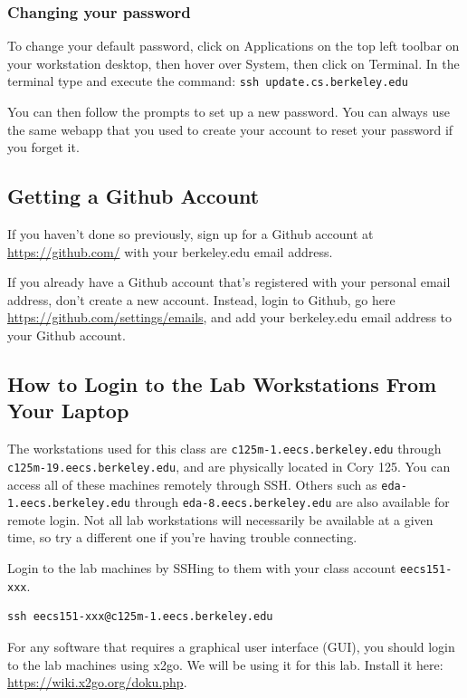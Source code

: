 \documentclass[11pt]{article}
\begin{document}
\subsubsection{Changing your password}
To change your default password, click on Applications on the top left toolbar on your workstation desktop, then hover over System, then click on Terminal. In the terminal type and execute the command: \verb|ssh update.cs.berkeley.edu|

You can then follow the prompts to set up a new password. You can always use the same webapp that you used to create your account to reset your password if you forget it.

\subsection{Getting a Github Account}
If you haven't done so previously, sign up for a Github account at \url{https://github.com/} with your berkeley.edu email address.

If you already have a Github account that's registered with your personal email address, don't create a new account. Instead, login to Github, go here \url{https://github.com/settings/emails}, and add your berkeley.edu email address to your Github account.

\subsection{How to Login to the Lab Workstations From Your Laptop}
The workstations used for this class are \texttt{c125m-1.eecs.berkeley.edu} through \texttt{c125m-19.eecs.berkeley.edu}, and are physically located in Cory 125.
You can access all of these machines remotely through SSH.
Others such as \texttt{eda-1.eecs.berkeley.edu} through \texttt{eda-8.eecs.berkeley.edu} are also available for remote login. Not all lab workstations will necessarily be available at a given time, so try a different one if you're having trouble connecting.

Login to the lab machines by SSHing to them with your class account \texttt{eecs151-xxx}.
\begin{verbatim}
ssh eecs151-xxx@c125m-1.eecs.berkeley.edu
\end{verbatim}

For any software that requires a graphical user interface (GUI), you should login to the lab machines using x2go. We will be using it for this lab. Install it here: \url{https://wiki.x2go.org/doku.php}.
\end{document}
